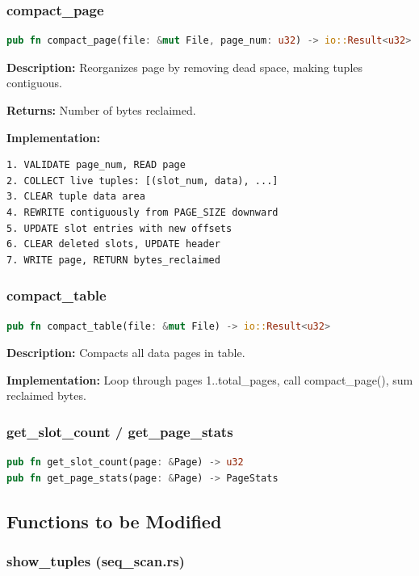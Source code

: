 \documentclass[11pt,a4paper]{article}
\begin{document}
\subsubsection{compact\_page}

\begin{lstlisting}[language=Rust]
pub fn compact_page(file: &mut File, page_num: u32) -> io::Result<u32>
\end{lstlisting}

\textbf{Description:} Reorganizes page by removing dead space, making tuples contiguous.

\textbf{Returns:} Number of bytes reclaimed.

\textbf{Implementation:}
\begin{lstlisting}
1. VALIDATE page_num, READ page
2. COLLECT live tuples: [(slot_num, data), ...]
3. CLEAR tuple data area
4. REWRITE contiguously from PAGE_SIZE downward
5. UPDATE slot entries with new offsets
6. CLEAR deleted slots, UPDATE header
7. WRITE page, RETURN bytes_reclaimed
\end{lstlisting}

\subsubsection{compact\_table}

\begin{lstlisting}[language=Rust]
pub fn compact_table(file: &mut File) -> io::Result<u32>
\end{lstlisting}

\textbf{Description:} Compacts all data pages in table.

\textbf{Implementation:} Loop through pages 1..total\_pages, call compact\_page(), sum reclaimed bytes.

\subsubsection{get\_slot\_count / get\_page\_stats}

\begin{lstlisting}[language=Rust]
pub fn get_slot_count(page: &Page) -> u32
pub fn get_page_stats(page: &Page) -> PageStats
\end{lstlisting}

\subsection{Functions to be Modified}

\subsubsection{show\_tuples (seq\_scan.rs)}
\end{document}
